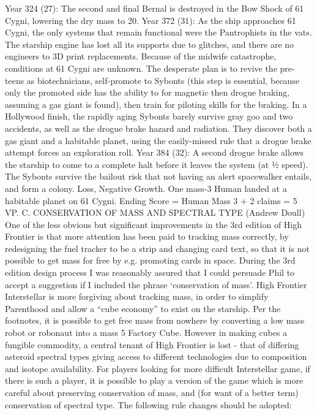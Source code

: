 \documentclass[a4paper]{book}
\begin{document}
Year 324 (27): The second and final Bernal is destroyed in the Bow Shock of 61 Cygni, lowering the dry mass to 20.
Year 372 (31): As the ship approaches 61 Cygni, the only systems that remain functional were the Pantrophists in the vats. The starship engine has lost all its supports due to glitches, and there are no engineers to 3D print replacements. Because of the midwife catastrophe, conditions at 61 Cygni are unknown. The desperate plan is to revive the pre-teens as biotechnicians, self-promote to Sybonts (this step is essential, because only the promoted side has the ability to for magnetic then drogue braking, assuming a gas giant is found), then train for piloting skills for the braking. In a Hollywood finish, the rapidly aging Sybonts barely survive gray goo and two accidents, as well as the drogue brake hazard and radiation. They discover both a gas giant and a habitable planet, using the easily-missed rule that a drogue brake attempt forces an exploration roll.
Year 384 (32): A second drogue brake allows the starship to come to a complete halt before it leaves the system (at ½ speed). The Sybonts survive the bailout risk that not having an alert spacewalker entails, and form a colony.
Loss, Negative Growth. One mass-3 Human landed at a habitable planet on 61 Cygni.
Ending Score = Human Mass 3 + 2 claims = 5 VP.
C. CONSERVATION OF MASS AND SPECTRAL TYPE (Andrew Doull)
One of the less obvious but significant improvements in the 3rd edition of High Frontier is that more attention has been paid to tracking mass correctly, by redesigning the fuel tracker to be a strip and changing card text, so that it is not possible to get mass for free by e.g. promoting cards in space. During the 3rd edition design process I was reasonably assured that I could persuade Phil to accept a suggestion if I included the phrase ‘conservation of mass’.
High Frontier Interstellar is more forgiving about tracking mass, in order to simplify Parenthood and allow a “cube economy” to exist on the starship. Per the footnotes, it is possible to get free mass from nowhere by converting a low mass robot or robonaut into a mass 5 Factory Cube. However in making cubes a fungible commodity, a central tenant of High Frontier is lost - that of differing asteroid spectral types giving access to different technologies due to composition and isotope availability.
For players looking for more difficult Interstellar game, if there is such a player, it is possible to play a version of the game which is more careful about preserving conservation of mass, and (for want of a better term) conservation of spectral type. The following rule changes should be adopted:
\end{document}
